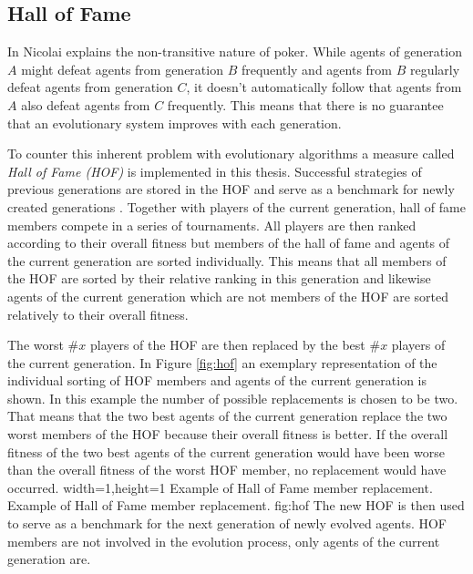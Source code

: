 \subsection{Hall of Fame}
\label{subsec:hof}
In \cite[p. 63]{evolutionary_methods} Nicolai explains the non-transitive nature of poker. While agents of generation $A$ might defeat agents from generation $B$ frequently and agents from $B$ regularly defeat agents from generation $C$, it doesn't automatically follow that agents from $A$ also defeat agents from $C$ frequently. This means that there is no guarantee that an evolutionary system improves with each generation. \par
To counter this inherent problem with evolutionary algorithms a measure called \textit{Hall of Fame (HOF)} is implemented in this thesis. Successful strategies of previous generations are stored in the HOF and serve as a benchmark for newly created generations \cite{evolutionary_method}. Together with players of the current generation, hall of fame members compete in a series of tournaments. All players are then ranked according to their overall fitness but members of the hall of fame and agents of the current generation are sorted individually. This means that all members of the HOF are sorted by their relative ranking in this generation and likewise agents of the current generation which are not members of the HOF are sorted relatively to their overall fitness. \par
The worst $\#x$ players of the HOF are then replaced by the best $\#x$ players of the current generation.
In Figure \ref{fig:hof} an exemplary representation of the individual sorting of HOF members and agents of the current generation is shown. In this example the number of possible replacements is chosen to be two. That means that the two best agents of the current generation replace the two worst members of the HOF because their overall fitness is better. If the overall fitness of the two best agents of the current generation would have been worse than the overall fitness of the worst HOF member, no replacement would have occurred.
  {width=1\textwidth,height=1\textheight}%
  {Example of Hall of Fame member replacement.}%
  {Example of Hall of Fame member replacement.}%
  {fig:hof}%
  The new HOF is then used to serve as a benchmark for the next generation of newly evolved agents.
 HOF members are not involved in the evolution process, only agents of the current generation are.
\pagebreak

